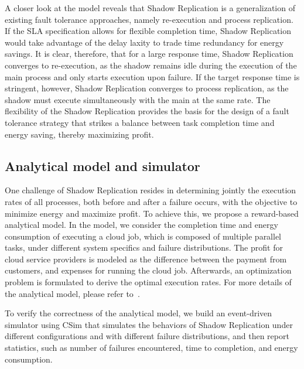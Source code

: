 A closer look at the model reveals that Shadow
Replication is a generalization of existing fault tolerance
approaches, namely re-execution and process replication. If the
SLA specification allows for flexible completion time, Shadow
Replication would take advantage of the delay laxity to trade time
redundancy for energy savings. It is clear, therefore, that for a
large response time, Shadow Replication converges to re-execution, as
the shadow remains idle during the execution of the main process and
only starts execution upon failure. If the target response time is
stringent, however, Shadow Replication converges to process replication,
as the shadow must execute simultaneously with the main at the same
rate. The flexibility of the Shadow Replication provides the
basis for the design of a fault tolerance strategy that strikes a
balance between task completion time and energy saving, thereby
maximizing profit.

\subsection{Analytical model and simulator}

One challenge of Shadow Replication resides in determining
jointly the execution rates of all processes, both before and
after a failure occurs, with the objective to minimize energy and
maximize profit. To achieve this, we propose a reward-based analytical
model. In the model, we consider the completion time and energy consumption of executing a cloud job, which is composed of multiple parallel tasks, under different system specifics and failure distributions. The profit for cloud service providers is modeled as the difference between the payment from customers, and expenses for running the cloud job. Afterwards, an optimization problem is formulated to derive the optimal execution rates. For more details of the analytical model, please refer to~\cite{cui_en7085151}. 

To verify the correctness of the analytical model, we build an event-driven simulator using CSim that simulates the behaviors of Shadow Replication under different configurations and with different failure distributions, and then report statistics, such as number of failures encountered, time to completion, and energy consumption. 

